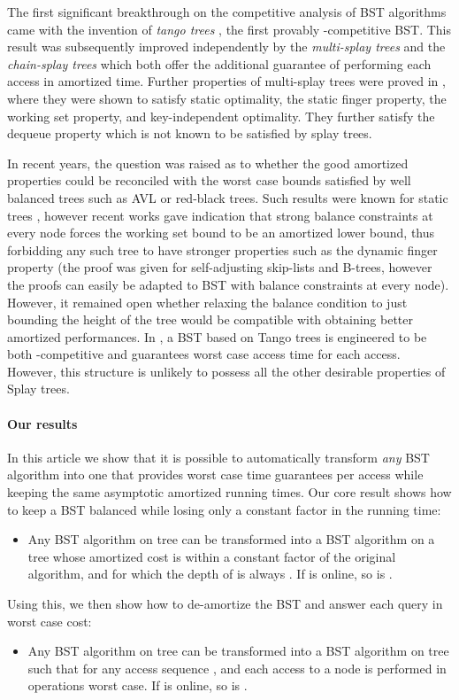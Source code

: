 \documentclass[11pt]{article}
\begin{document}
The first significant breakthrough on the competitive analysis of BST
algorithms came with the invention of \emph{tango trees} \cite{tangotrees}, the first
provably -competitive BST. This result was subsequently
improved independently by the \emph{multi-splay trees}
\cite{multisplay} and the \emph{chain-splay trees} \cite{chain-splay} which both offer
the additional guarantee of performing each access in 
amortized time. Further properties of multi-splay trees were proved in
\cite{multisplayprop}, where they were shown to satisfy static
optimality, the static finger property, the working set property, and
key-independent optimality. They further satisfy the dequeue property
which is not known to be satisfied by splay trees.

In recent years, the question was raised as to whether the good
amortized properties could be reconciled with the  worst
case bounds satisfied by well balanced trees such as AVL or red-black
trees.
Such results were known for static trees \cite{balancestatic}, however
recent works gave indication that strong balance constraints at every
node forces the working set bound to be an amortized lower bound, thus forbidding
any such tree to have stronger properties such as the dynamic finger property
\cite{skiplists_SODA08} (the proof was given for self-adjusting
skip-lists and B-trees, however the proofs can easily be adapted to
BST with balance constraints at every node). However, it remained open
whether relaxing the balance condition to just bounding the height of
the tree would be compatible with obtaining better amortized performances.
In \cite{competworstcase}, a BST based on Tango trees \cite{tangotrees} is engineered to be both
-competitive and guarantees  worst case
access time for each access. However, this structure is unlikely to
possess all the other desirable properties of Splay trees.

\paragraph{Our results}

In this article we show that it is possible to automatically transform \emph{any}
BST algorithm into one that provides worst case time guarantees per access
while keeping the same asymptotic amortized running times. Our core result
shows how to keep a BST balanced while losing only a constant factor in the
running time:
\begin{itemize}
\item Any BST algorithm  on tree  can be transformed into a BST
algorithm  on a tree  whose amortized cost is within a constant
factor of the original algorithm, and for which the depth of  is always
. If  is online, so is .
\end{itemize}
Using this, we then show how to de-amortize the BST and answer each query
in  worst case cost:
\begin{itemize}
\item Any BST algorithm  on tree  can be transformed into a BST
algorithm  on tree  such that for any access sequence ,
 and each access to a node is performed in  operations worst case. If  is online, so is .
\end{itemize}
\end{document}
